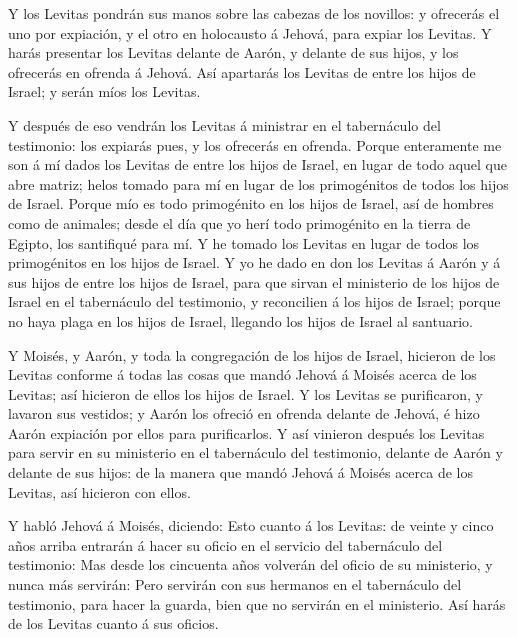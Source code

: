  Y los Levitas pondrán sus manos sobre las cabezas de los
novillos: y ofrecerás el uno por expiación, y el otro en holocausto á
Jehová, para expiar los Levitas.  Y harás presentar los
Levitas delante de Aarón, y delante de sus hijos, y los ofrecerás en
ofrenda á Jehová.  Así apartarás los Levitas de entre los
hijos de Israel; y serán míos los Levitas.

 Y después de eso vendrán los Levitas á ministrar en el
tabernáculo del testimonio: los expiarás pues, y los ofrecerás en
ofrenda.  Porque enteramente me son á mí dados los Levitas
de entre los hijos de Israel, en lugar de todo aquel que abre matriz;
helos tomado para mí en lugar de los primogénitos de todos los hijos de
Israel.  Porque mío es todo primogénito en los hijos de
Israel, así de hombres como de animales; desde el día que yo herí todo
primogénito en la tierra de Egipto, los santifiqué para mí.
 Y he tomado los Levitas en lugar de todos los primogénitos
en los hijos de Israel.  Y yo he dado en don los Levitas á
Aarón y á sus hijos de entre los hijos de Israel, para que sirvan el
ministerio de los hijos de Israel en el tabernáculo del testimonio, y
reconcilien á los hijos de Israel; porque no haya plaga en los hijos de
Israel, llegando los hijos de Israel al santuario.

 Y Moisés, y Aarón, y toda la congregación de los hijos de
Israel, hicieron de los Levitas conforme á todas las cosas que mandó
Jehová á Moisés acerca de los Levitas; así hicieron de ellos los hijos
de Israel.  Y los Levitas se purificaron, y lavaron sus
vestidos; y Aarón los ofreció en ofrenda delante de Jehová, é hizo Aarón
expiación por ellos para purificarlos.  Y así vinieron
después los Levitas para servir en su ministerio en el tabernáculo del
testimonio, delante de Aarón y delante de sus hijos: de la manera que
mandó Jehová á Moisés acerca de los Levitas, así hicieron con ellos.

 Y habló Jehová á Moisés, diciendo:  Esto
cuanto á los Levitas: de veinte y cinco años arriba entrarán á hacer su
oficio en el servicio del tabernáculo del testimonio:  Mas
desde los cincuenta años volverán del oficio de su ministerio, y nunca
más servirán:  Pero servirán con sus hermanos en el
tabernáculo del testimonio, para hacer la guarda, bien que no servirán
en el ministerio. Así harás de los Levitas cuanto á sus oficios.

